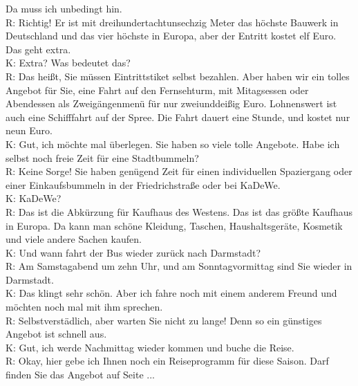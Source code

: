 Da muss ich unbedingt hin.  \\
R: Richtig! Er ist mit dreihundertachtunsechzig Meter das höchste Bauwerk in Deutschland und
das vier höchste in Europa, aber der Entritt kostet elf Euro. Das geht extra. \\
K: Extra? Was bedeutet das? \\
R: Das heißt, Sie müssen Eintrittstiket selbst bezahlen.
Aber haben wir ein tolles Angebot für Sie, eine Fahrt auf den Fernsehturm,
mit Mitagsessen oder Abendessen als Zweigängenmenü für nur zweiunddeißig Euro.
Lohnenswert ist auch eine Schifffahrt auf der Spree.
Die Fahrt dauert eine Stunde, und kostet nur neun Euro. \\
K: Gut, ich möchte mal überlegen.  Sie haben so viele tolle Angebote.
Habe ich selbst noch freie Zeit für eine Stadtbummeln?  \\
R: Keine Sorge! Sie haben genügend  Zeit für einen individuellen Spaziergang oder
einer Einkaufsbummeln in der Friedrichstraße oder bei KaDeWe. \\
K: KaDeWe? \\
R: Das ist die Abkürzung für Kaufhaus des Westens. 
Das ist das größte Kaufhaus in Europa.
Da kann man schöne Kleidung, Taschen, Haushaltsgeräte, Kosmetik und viele andere Sachen kaufen. \\
K: Und wann fahrt der Bus wieder zurück nach Darmstadt? \\
R: Am Samstagabend um zehn Uhr, und am Sonntagvormittag sind Sie wieder in Darmstadt. \\
K: Das klingt sehr schön. Aber ich fahre noch mit einem anderem Freund und möchten noch mal mit ihm sprechen. \\
R: Selbstverstädlich, aber warten Sie nicht zu lange!
Denn so ein günstiges Angebot ist schnell aus. \\
K: Gut, ich werde Nachmittag wieder kommen und buche die Reise. \\
R: Okay, hier gebe ich Ihnen noch ein Reiseprogramm für diese Saison. 
Darf finden Sie das Angebot auf Seite ...  \\


